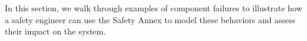

In this section, we walk through examples of component failures to illustrate how a safety engineer can use the Safety Annex to model these behaviors and assess their impact on the system.


